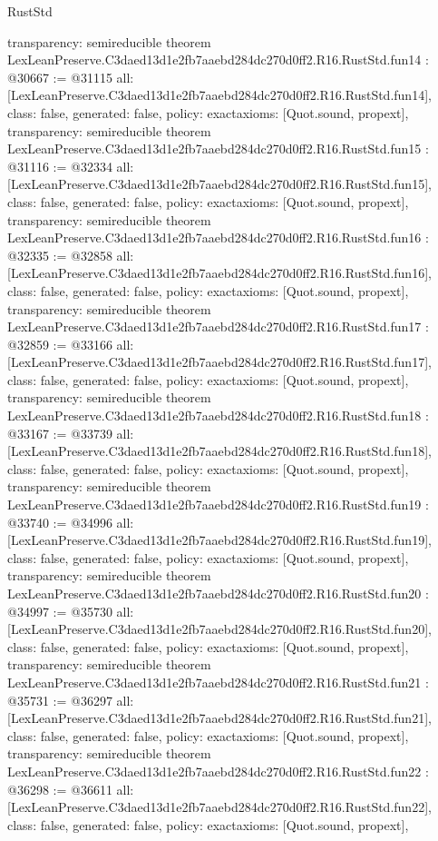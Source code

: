 \begin{lexlean}{RustStd}
\begin{coremodule}
{  transparency: semireducible
}
theorem LexLeanPreserve.C3daed13d1e2fb7aaebd284dc270d0ff2.R16.RustStd.fun14 : @30667 := @31115 {
  all: [LexLeanPreserve.C3daed13d1e2fb7aaebd284dc270d0ff2.R16.RustStd.fun14],
  class: false,
  generated: false,
  policy: exact{axioms: [Quot.sound, propext]},
  transparency: semireducible
}
theorem LexLeanPreserve.C3daed13d1e2fb7aaebd284dc270d0ff2.R16.RustStd.fun15 : @31116 := @32334 {
  all: [LexLeanPreserve.C3daed13d1e2fb7aaebd284dc270d0ff2.R16.RustStd.fun15],
  class: false,
  generated: false,
  policy: exact{axioms: [Quot.sound, propext]},
  transparency: semireducible
}
theorem LexLeanPreserve.C3daed13d1e2fb7aaebd284dc270d0ff2.R16.RustStd.fun16 : @32335 := @32858 {
  all: [LexLeanPreserve.C3daed13d1e2fb7aaebd284dc270d0ff2.R16.RustStd.fun16],
  class: false,
  generated: false,
  policy: exact{axioms: [Quot.sound, propext]},
  transparency: semireducible
}
theorem LexLeanPreserve.C3daed13d1e2fb7aaebd284dc270d0ff2.R16.RustStd.fun17 : @32859 := @33166 {
  all: [LexLeanPreserve.C3daed13d1e2fb7aaebd284dc270d0ff2.R16.RustStd.fun17],
  class: false,
  generated: false,
  policy: exact{axioms: [Quot.sound, propext]},
  transparency: semireducible
}
theorem LexLeanPreserve.C3daed13d1e2fb7aaebd284dc270d0ff2.R16.RustStd.fun18 : @33167 := @33739 {
  all: [LexLeanPreserve.C3daed13d1e2fb7aaebd284dc270d0ff2.R16.RustStd.fun18],
  class: false,
  generated: false,
  policy: exact{axioms: [Quot.sound, propext]},
  transparency: semireducible
}
theorem LexLeanPreserve.C3daed13d1e2fb7aaebd284dc270d0ff2.R16.RustStd.fun19 : @33740 := @34996 {
  all: [LexLeanPreserve.C3daed13d1e2fb7aaebd284dc270d0ff2.R16.RustStd.fun19],
  class: false,
  generated: false,
  policy: exact{axioms: [Quot.sound, propext]},
  transparency: semireducible
}
theorem LexLeanPreserve.C3daed13d1e2fb7aaebd284dc270d0ff2.R16.RustStd.fun20 : @34997 := @35730 {
  all: [LexLeanPreserve.C3daed13d1e2fb7aaebd284dc270d0ff2.R16.RustStd.fun20],
  class: false,
  generated: false,
  policy: exact{axioms: [Quot.sound, propext]},
  transparency: semireducible
}
theorem LexLeanPreserve.C3daed13d1e2fb7aaebd284dc270d0ff2.R16.RustStd.fun21 : @35731 := @36297 {
  all: [LexLeanPreserve.C3daed13d1e2fb7aaebd284dc270d0ff2.R16.RustStd.fun21],
  class: false,
  generated: false,
  policy: exact{axioms: [Quot.sound, propext]},
  transparency: semireducible
}
theorem LexLeanPreserve.C3daed13d1e2fb7aaebd284dc270d0ff2.R16.RustStd.fun22 : @36298 := @36611 {
  all: [LexLeanPreserve.C3daed13d1e2fb7aaebd284dc270d0ff2.R16.RustStd.fun22],
  class: false,
  generated: false,
  policy: exact{axioms: [Quot.sound, propext]},
}
\end{coremodule}
\end{lexlean}
